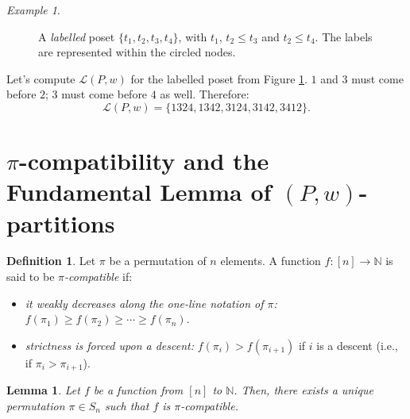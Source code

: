 \documentclass[11pt]{amsart}
\theoremstyle{plain}
\newtheorem{lemma}[theorem]{Lemma}
\theoremstyle{definition}
\newtheorem{definition}{Definition}
\theoremstyle{remark}
\newtheorem{example}{Example}[section]
\newcommand{\LL}{\mathcal{L}}
\newcommand{\NN}{\mathbb{N}}
\numberwithin{equation}{section}
\begin{document}
\begin{example}
	\begin{figure}[h]
		\centering
		\caption{A \textit{labelled} poset $\{t_1, t_2, t_3, t_4\}$, with
			$t_1$, $t_2 \leq t_3$ and $t_2 \leq t_4$. The labels are represented within
			the circled nodes.}
		\label{fig:example_Lpw}
	\end{figure}

	Let's compute $\LL(P, w)$ for the labelled poset from Figure \ref{fig:example_Lpw}.
	$1$ and $3$ must come before $2$; $3$ must come before $4$ as well. Therefore:
	\[ \LL(P, w) = \{ 1324, 1342, 3124, 3142, 3412 \}. \]
\end{example}

\section{\texorpdfstring{$\pi$}{π}-compatibility and the Fundamental Lemma of \texorpdfstring{$(P, w)$}{(P, w)}-partitions}

\begin{definition}
	Let $\pi$ be a permutation of $n$ elements. A function $f : [n] \to \NN$ is said to be \textit{$\pi$-compatible} if:

	\begin{itemize}
		\item \textit{it weakly decreases along the one-line notation of $\pi$:} $f(\pi_1) \geq f(\pi_2) \geq \cdots \geq f(\pi_n)$.
		\item \textit{strictness is forced upon a descent:} $f(\pi_i) > f(\pi_{i+1})$ if $i$ is a descent (i.e., if $\pi_i > \pi_{i+1}$).
	\end{itemize}
\end{definition}

\begin{lemma}
	Let $f$ be a function from $[n]$ to $\NN$. Then, there exists a unique permutation $\pi \in S_n$ such that
	$f$ is $\pi$-compatible. \label{lem:unique_pi_permutation}
\end{lemma}
\end{document}
